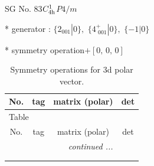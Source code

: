 \documentclass[fleqn,8pt]{jsarticle}
\begin{document}
\setcounter{MaxMatrixCols}{32}

\renewcommand{\tablename}{Table~}
\renewcommand{\figurename}{Figure~}
\begin{center}
\LARGE
SG No. 83\quad$C_{\rm 4h}^{1}$\quad$P4/m$\quad[ tetragonal ]
\end{center}

* generator : $\{2{}_{001}|0\},\,\,\{4^{+}_{\,\,001}|0\},\,\,\{-1|0\}$

* symmetry operation\quad$+\left[ 0,\, 0,\, 0 \right]$
\renewcommand{\arraystretch}{1.3}
\begin{longtable}{cccc}
\caption{Symmetry operations for 3d polar vector.}
 \\
 \hline \hline
No. & tag & matrix (polar) & det \\ \hline \endfirsthead

\multicolumn{3}{l}{\tablename\ \thetable{}} \\
 \hline \hline
No. & tag & matrix (polar) & det \\ \hline \endhead

 \hline \hline
\multicolumn{3}{r}{\footnotesize\it continued ...} \\ \endfoot

 \hline \hline
\multicolumn{3}{r}{} \\ \endlastfoot


\end{longtable}
\end{document}
